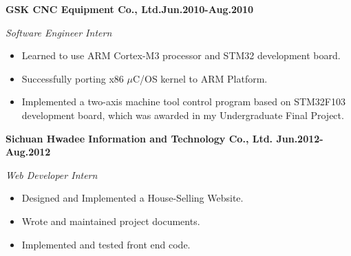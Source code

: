 \documentclass{myres}
\begin{document}
{
	\textbf{GSK CNC Equipment Co., Ltd.\hfill Jun.2010-Aug.2010}
	\par
	{\it Software Engineer Intern}
  \begin{itemize}[topsep=0pt, leftmargin=0.2in] \itemsep -5pt
			\item Learned to use ARM Cortex-M3 processor and STM32 development board.
			\item Successfully porting x86 $\mu$C/OS kernel to ARM Platform.
			\item Implemented a two-axis machine tool control program based on
				STM32F103 development board, which was awarded in my
				Undergraduate Final Project.
	\end{itemize}
	\par
	\smallskip
	\textbf{Sichuan Hwadee Information and Technology Co., Ltd. \hfill Jun.2012-Aug.2012}
	\par
	{\it Web Developer Intern}
  \begin{itemize}[topsep=0pt, leftmargin=0.2in] \itemsep -5pt
		\item Designed and Implemented a House-Selling Website.
		\item Wrote and maintained project documents.
	  \item Implemented and tested front end code.
	\end{itemize}
	\par
}
\end{document}
